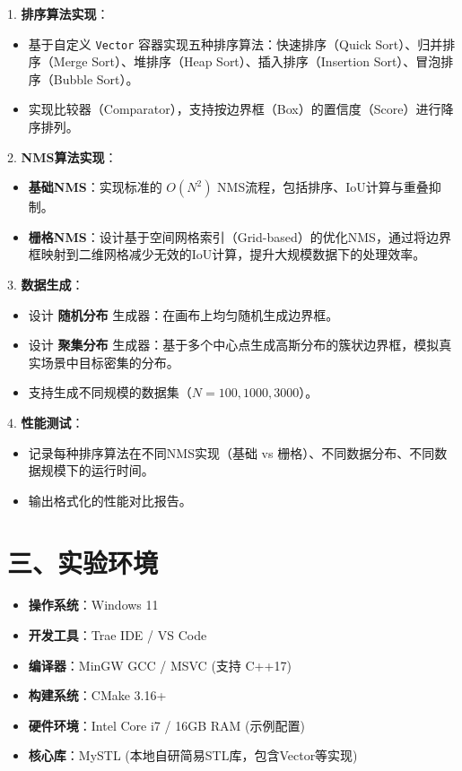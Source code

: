\documentclass[a4paper,12pt]{ctexart}
\begin{document}
1. \textbf{排序算法实现}：
   \begin{itemize}
       \item 基于自定义 \texttt{Vector} 容器实现五种排序算法：快速排序（Quick Sort）、归并排序（Merge Sort）、堆排序（Heap Sort）、插入排序（Insertion Sort）、冒泡排序（Bubble Sort）。
       \item 实现比较器（Comparator），支持按边界框（Box）的置信度（Score）进行降序排列。
   \end{itemize}

2. \textbf{NMS算法实现}：
   \begin{itemize}
       \item \textbf{基础NMS}：实现标准的 $O(N^2)$ NMS流程，包括排序、IoU计算与重叠抑制。
       \item \textbf{栅格NMS}：设计基于空间网格索引（Grid-based）的优化NMS，通过将边界框映射到二维网格减少无效的IoU计算，提升大规模数据下的处理效率。
   \end{itemize}

3. \textbf{数据生成}：
   \begin{itemize}
       \item 设计 \textbf{随机分布} 生成器：在画布上均匀随机生成边界框。
       \item 设计 \textbf{聚集分布} 生成器：基于多个中心点生成高斯分布的簇状边界框，模拟真实场景中目标密集的分布。
       \item 支持生成不同规模的数据集（$N=100, 1000, 3000$）。
   \end{itemize}

4. \textbf{性能测试}：
   \begin{itemize}
       \item 记录每种排序算法在不同NMS实现（基础 vs 栅格）、不同数据分布、不同数据规模下的运行时间。
       \item 输出格式化的性能对比报告。
   \end{itemize}

\section*{三、实验环境}

\begin{itemize}
    \item \textbf{操作系统}：Windows 11
    \item \textbf{开发工具}：Trae IDE / VS Code
    \item \textbf{编译器}：MinGW GCC / MSVC (支持 C++17)
    \item \textbf{构建系统}：CMake 3.16+
    \item \textbf{硬件环境}：Intel Core i7 / 16GB RAM (示例配置)
    \item \textbf{核心库}：MySTL (本地自研简易STL库，包含Vector等实现)
\end{itemize}
\end{document}
